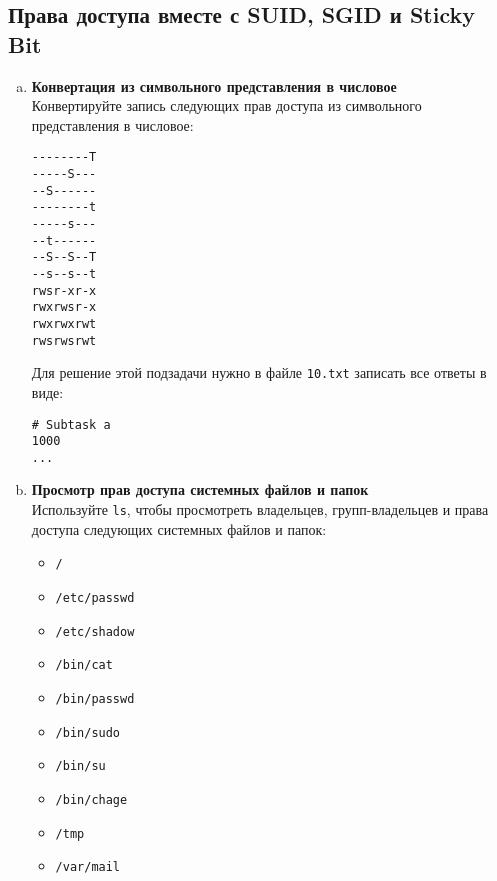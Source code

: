 \documentclass{article}
\begin{document}
\subsection{Права доступа вместе с SUID, SGID и Sticky Bit}

\begin{enumerate}[a.]
\item \textbf{Конвертация из символьного представления в числовое}\\
Конвертируйте запись следующих прав доступа из символьного представления в числовое:
\begin{lstlisting}
--------T
-----S---
--S------
--------t
-----s---
--t------
--S--S--T
--s--s--t
rwsr-xr-x
rwxrwsr-x
rwxrwxrwt
rwsrwsrwt
\end{lstlisting}
Для решение этой подзадачи нужно в файле \texttt{10.txt} записать все ответы в виде:
\begin{lstlisting}
# Subtask a
1000
...
\end{lstlisting}

\item \textbf{Просмотр прав доступа системных файлов и папок}\\
Используйте \texttt{ls}, чтобы просмотреть владельцев, групп-владельцев и права доступа следующих системных файлов и папок:
\begin{itemize}
\item \texttt{/}
\item \texttt{/etc/passwd}
\item \texttt{/etc/shadow}
\item \texttt{/bin/cat}
\item \texttt{/bin/passwd}
\item \texttt{/bin/sudo}
\item \texttt{/bin/su}
\item \texttt{/bin/chage}
\item \texttt{/tmp}
\item \texttt{/var/mail}
\end{itemize}
\end{enumerate}


\iffalse
\newpage
~
\newpage
\end{document}
